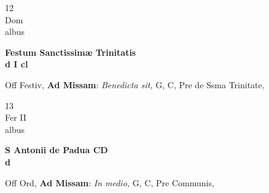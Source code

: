 \documentclass[10pt, openany]{book}
\begin{document}
        \begin{center}
            \begin{minipage}{3.5in}
                \vspace{2em}
                \begin{minipage}{0.5in}
                    {\Huge 12} \\
                    {\normalsize Dom} \\
                    {\normalsize albus}
                \end{minipage}
                \begin{minipage}{3.0in}
                    \textbf{ \large Festum Sanctissimæ Trinitatis \\
                    \textnormal{\normalsize d I cl}} \\ 
                \end{minipage}
                \begin{justify}Off Festiv, \textbf{Ad Missam}: \textit{Benedicta sit,} G, C, Pre de Ssma Trinitate,   
                \end{justify}
            \end{minipage}
        \end{center}
    
        \begin{center}
            \begin{minipage}{3.5in}
                \vspace{2em}
                \begin{minipage}{0.5in}
                    {\Huge 13} \\
                    {\normalsize Fer II} \\
                    {\normalsize albus}
                \end{minipage}
                \begin{minipage}{3.0in}
                    \textbf{ \large S Antonii de Padua CD \\
                    \textnormal{\normalsize d}} \\ 
                \end{minipage}
                \begin{justify}Off Ord, \textbf{Ad Missam}: \textit{In medio,} G, C, Pre Communis,   
                \end{justify}
            \end{minipage}
        \end{center}
    
\end{document}
